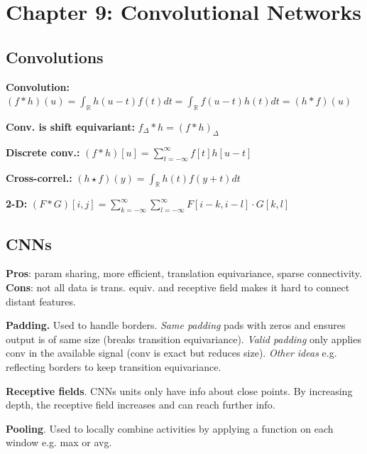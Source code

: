 \section*{Chapter 9: Convolutional Networks}
\subsection*{Convolutions}
\textbf{Convolution:} $(f*h)(u) = \int_{\mathbb{R}} h(u-t)f(t)dt = \int_{\mathbb{R}} f(u-t)h(t)dt = (h*f)(u)$ 

\textbf{Conv. is shift equivariant:} $f_{\Delta}*h = (f*h)_{\Delta}$

\textbf{Discrete conv.:} $(f*h)[u] = \sum_{t=-\infty}^{\infty}f[t]h[u-t]$

\textbf{Cross-correl.:} $(h\star f)(y) = \int_{\mathbb{R}} h(t)f(y+t)dt$

\textbf{2-D:} $(F*G)[i,j] = \sum_{k=-\infty}^{\infty}\sum_{l=-\infty}^{\infty}F[i-k, i-l] \cdot G[k,l]$

\subsection*{CNNs}
\textbf{Pros}: param sharing, more efficient, translation equivariance, sparse connectivity. \textbf{Cons}: not all data is trans. equiv. and receptive field makes it hard to connect distant features.

\textbf{Padding.} Used to handle borders. \emph{Same padding} pads with zeros and ensures output is of same size (breaks transition equivariance). \emph{Valid padding} only applies conv in the available signal (conv is exact but reduces size). \emph{Other ideas} e.g. reflecting borders to keep transition equivariance.

\textbf{Receptive fields}. CNNs units only have info about close points. By increasing depth, the receptive field increases and can reach further info.

\textbf{Pooling}. Used to locally combine activities by applying a function on each window e.g. max or avg.

